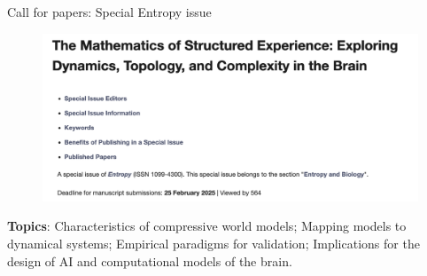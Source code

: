 \begin{frame}{Call for papers: Special Entropy issue}

\begin{figure}
        \centering
        \includegraphics[width=0.75\linewidth]{image8.png}
    \end{figure}
        

\textbf{Topics}: Characteristics of compressive world models; Mapping models to dynamical systems;  
Empirical paradigms for validation; 
Implications for the design of AI and computational models of the brain. %
\end{frame}
